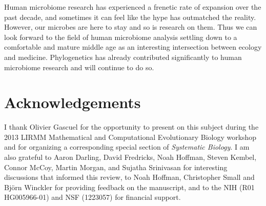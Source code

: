 \documentclass{amsart}
\newcommand{\notforarxiv}[1]{}
\begin{document}
Human microbiome research has experienced a frenetic rate of expansion over the past decade, and sometimes it can feel like the hype has outmatched the reality.
However, our microbes are here to stay and so is research on them.
Thus we can look forward to the field of human microbiome analysis settling down to a comfortable and mature middle age as an interesting intersection between ecology and medicine.
Phylogenetics has already contributed significantly to human microbiome research and will continue to do so.



\section{Acknowledgements}
I thank Olivier Gascuel for the opportunity to present on this subject during the 2013 LIRMM Mathematical and Computational Evolutionary Biology workshop and for organizing a corresponding special section of \textit{Systematic Biology}.
I am also grateful to Aaron Darling, David Fredricks, Noah Hoffman, Steven Kembel, Connor McCoy, Martin Morgan, and Sujatha Srinivasan for interesting discussions that informed this review, to Noah Hoffman, Christopher Small and Bj\"orn Winckler for providing feedback on the manuscript, and to the NIH (R01 HG005966-01) and NSF (1223057) for financial support.


\notforarxiv{
\newpage
\section{Figure Legends}

\noindent
Figure 1: \unifracLegend

\noindent
Figure 2: \dirtpilesLegend

\clearpage

\newpage
}



\end{document}
